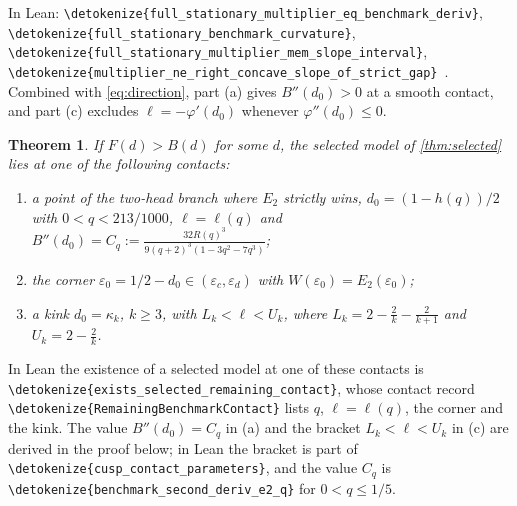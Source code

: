 \documentclass[10pt]{article}
\newtheorem{theorem}{Theorem}[section]
\theoremstyle{definition}
\theoremstyle{remark}
\numberwithin{equation}{section}
\newcommand{\eps}{\varepsilon}
\newcommand{\leanid}[1]{\expandafter\nolinkurl\expandafter{\detokenize{#1}}}
\newcommand{\Fm}[1]{\cite[#1]{Formalization}}
\begin{document}
In Lean: \leanid{full_stationary_multiplier_eq_benchmark_deriv}, \leanid{full_stationary_benchmark_curvature}, \leanid{full_stationary_multiplier_mem_slope_interval}, \leanid{multiplier_ne_right_concave_slope_of_strict_gap}~\Fm{\S8.1, \S9}. Combined with \eqref{eq:direction}, part (a) gives $B''(d_0)>0$ at a smooth contact, and part (c) excludes $\ell=-\varphi'(d_0)$ whenever $\varphi''(d_0)\le0$.

\begin{theorem}\label{thm:location}
If $F(d)>B(d)$ for some $d$, the selected model of \cref{thm:selected} lies at one of the following contacts:
\begin{enumerate}[label=\textup{(\alph*)},leftmargin=2em]
\item a point of the two-head branch where $E_2$ strictly wins, $d_0=(1-h(q))/2$ with $0<q<213/1000$, $\ell=\ell(q)$ and $B''(d_0)=C_q:=\frac{32R(q)^3}{9(q+2)^3(1-3q^2-7q^3)}$;
\item the corner $\eps_0=1/2-d_0\in(\eps_c,\eps_d)$ with $W(\eps_0)=E_2(\eps_0)$;
\item a kink $d_0=\kappa_k$, $k\ge3$, with $L_k<\ell<U_k$, where $L_k=2-\frac2k-\frac2{k+1}$ and $U_k=2-\frac2k$.
\end{enumerate}
\end{theorem}

In Lean the existence of a selected model at one of these contacts is \leanid{exists_selected_remaining_contact}, whose contact record \leanid{RemainingBenchmarkContact} lists $q$, $\ell=\ell(q)$, the corner and the kink. The value $B''(d_0)=C_q$ in (a) and the bracket $L_k<\ell<U_k$ in (c) are derived in the proof below; in Lean the bracket is part of \leanid{cusp_contact_parameters}, and the value $C_q$ is \leanid{benchmark_second_deriv_e2_q} for $0<q\le1/5$.
\end{document}
